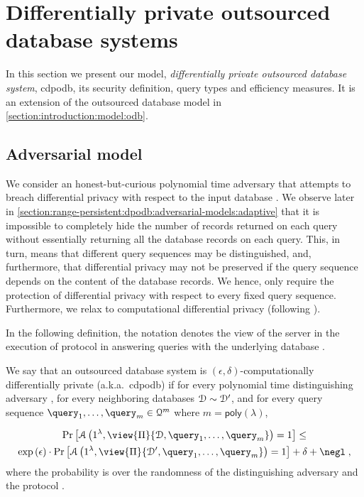\section{Differentially private outsourced database systems}\label{section:range-persistent:dpodb}

	In this section we present our model, \emph{differentially private outsourced database system}, \acrshort{cdpodb}, its security definition, query types and efficiency measures.
	It is an extension of the outsourced database model in \cref{section:introduction:model:odb}.

	\subsection{Adversarial model}\label{section:range-persistent:dpodb:adversarial-models}

		We consider an honest-but-curious polynomial time adversary that attempts to breach differential privacy with respect to the input database \database{}.
		We observe later in \cref{section:range-persistent:dpodb:adversarial-models:adaptive} that it is impossible to completely hide the number of records returned on each query without essentially returning all the database records on each query.
		This, in turn, means that different query sequences may be distinguished, and, furthermore, that differential privacy may not be preserved if the query sequence depends on the content of the database records.
		We hence, only require the protection of differential privacy with respect to every fixed query sequence.
		Furthermore, we relax to computational differential privacy (following \cite{computational-dp}).

		In the following definition, the notation  denotes the view of the server \server{} in the execution of protocol \protocol{} in answering queries  with the underlying database \database{}.

		\begin{definition}
			We say that an outsourced database system \protocol{} is $(\epsilon, \delta)$-computationally differentially private (a.k.a.~\acrshort{cdpodb}) if for every polynomial time distinguishing adversary \adversary{}, for every neighboring databases $\mathcal{D} \sim \mathcal{D}^\prime$, and for every query sequence $\fromNtoM{\query}{1}{m} \in \querySet^m$ where $m = \mathsf{poly}(\lambda)$,

			\begin{multline*}
				\probability{\adversary \left( 1^\lambda, \view{\protocol{}}{\database, \fromNtoM{\query}{1}{m}} \right) = 1 } \leq \\
				\exp{(\epsilon)} \cdot \probability{\adversary \left( 1^\lambda, \view{\protocol{}}{\database^\prime, \fromNtoM{\query}{1}{m}} \right) = 1} + \delta +\negl \; ,
			\end{multline*}
			where the probability is over the randomness of the distinguishing adversary \adversary{} and the protocol \protocol{}.
		\end{definition}

